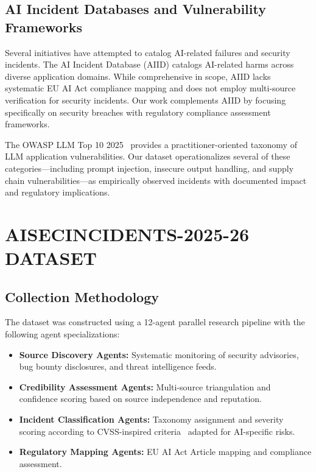 \documentclass[10pt,conference]{IEEEtran}
\begin{document}
\subsection{AI Incident Databases and Vulnerability Frameworks}

Several initiatives have attempted to catalog AI-related failures and security incidents. The AI Incident Database (AIID) catalogs AI-related harms across diverse application domains. While comprehensive in scope, AIID lacks systematic EU AI Act compliance mapping and does not employ multi-source verification for security incidents. Our work complements AIID by focusing specifically on security breaches with regulatory compliance assessment frameworks.

The OWASP LLM Top 10 2025~\cite{owasp_llm2025} provides a practitioner-oriented taxonomy of LLM application vulnerabilities. Our dataset operationalizes several of these categories---including prompt injection, insecure output handling, and supply chain vulnerabilities---as empirically observed incidents with documented impact and regulatory implications.

\section{AISECINCIDENTS-2025-26 DATASET}
\label{sec:dataset}

\subsection{Collection Methodology}

The dataset was constructed using a 12-agent parallel research pipeline with the following agent specializations:

\begin{itemize}
    \item \textbf{Source Discovery Agents:} Systematic monitoring of security advisories, bug bounty disclosures, and threat intelligence feeds.
    \item \textbf{Credibility Assessment Agents:} Multi-source triangulation and confidence scoring based on source independence and reputation.
    \item \textbf{Incident Classification Agents:} Taxonomy assignment and severity scoring according to CVSS-inspired criteria~\cite{cvss2024} adapted for AI-specific risks.
    \item \textbf{Regulatory Mapping Agents:} EU AI Act Article mapping and compliance assessment.
\end{itemize}
\end{document}
